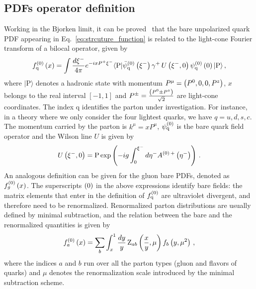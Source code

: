 \subsection{PDFs operator definition}
Working in the Bjorken limit, it can be proved~\cite{Collins:1980ui,Collins:1981uw} that the bare unpolarized 
quark PDF appearing in Eq.~\eqref{eq:strcuture_function} is related to the light-cone Fourier transform 
of a bilocal operator, given by
\begin{align}
	\label{eq::barepdf}                                                  
	f_\mathrm{q}^{(0)}\left( x \right) = \int \frac{d\xi^-}{4\pi} e^{-ixP^+\xi^-} 
	\langle \text{P}|\bar{\psi}_\mathrm{q}^{(0)}\left(\xi^-\right)\gamma^+ \,   
	U\left(\xi^-,0\right) \psi_\mathrm{q}^{(0)}\left( 0\right)  |\text{P}\rangle\, ,   
\end{align}
where $|\text{P}\rangle$ denotes a hadronic state with momentum $P^\mu = \left(
P^0,0,0,P^z\right)$, $x$ belongs to the real interval $\left[-1,1\right]$ and $P^{\pm}=\frac {\left( P^0 \pm P^z \right)}{ \sqrt{2}}$ are
light-cone coordinates. 
The index $\mathrm{q}$ identifies the parton under
investigation. For instance, in a theory where we only consider the four
lightest quarks, we have $q=u,d,s,c$. The momentum carried by the parton is
$k^\mu = x P^\mu$, $\psi_\mathrm{q}^{(0)}$ is the bare quark field operator and the
Wilson line $U$ is given by 
\begin{align}
	\label{eq::wilsonline}                                                      U\left(\xi^-,0\right) = \text{P}\exp 
    \left( -ig\int_0^{\xi^-}d\eta^- A^{{(0)}\,+}\left( \eta^- \right) \right)\, .         
\end{align}
An analogous definition can be given for the gluon bare PDFs, denoted as
$f_g^{(0)}\left( x \right)$. The superscripts ${(0)}$ in the above expressions identify
bare fields: the matrix elements that enter in the definition of
$f_\mathrm{q}^{(0)}$ are ultraviolet divergent, and therefore need to be
renormalized.
Renormalized parton distributions are usually defined by minimal
subtraction, and the relation between the bare and the renormalized quantities
is given by
\begin{align}
	\label{eq:RenormPDF}                                   
	f_a^{(0)}\left( x \right) = \sum_{b}\int_x^1\frac{dy}{y}\,\text{Z}_{ab}\left(\frac{x}{y},\mu \right) f_b\left( y,\mu^2 \right)\, , 
\end{align}
where the indices $a$ and $b$ run over all the parton types (gluon and flavors
of quarks) and $\mu$ denotes the renormalization scale introduced by the minimal
subtraction scheme. 

